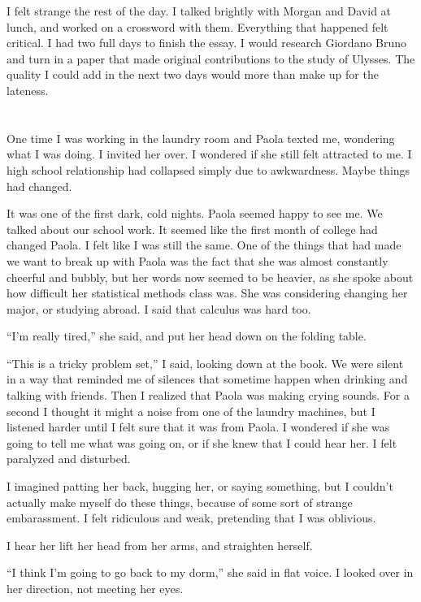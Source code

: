 I felt strange the rest of the day.  I talked brightly with Morgan and David at
lunch, and worked on a crossword with them.  Everything that happened felt
critical.  I had two full days to finish the essay.  I would research Giordano
Bruno and turn in a paper that made original contributions to the study of
Ulysses. The quality I could add in the next two days would more than make up
for the lateness.  

\section{} 

One time I was working in the laundry room and Paola texted me, wondering what I
was doing.  I invited her over.  I wondered if she still felt attracted to me.
I high school relationship had collapsed simply due to awkwardness.  Maybe
things had changed.  

It was one of the first dark, cold nights.  Paola seemed happy to see me.  We
talked about our school work.  It seemed like the first month of college had
changed Paola.  I felt like I was still the same.  One of the things that had
made we want to break up with Paola was the fact that she was almost constantly
cheerful and bubbly, but her words now seemed to be heavier, as she spoke about
how difficult her statistical methods class was.  She was considering changing
her major, or studying abroad.  I said that calculus was hard too. 

``I'm really tired,'' she said, and put her head down on the folding table.

``This is a tricky problem set,'' I said, looking down at the book.  We were
silent in a way that reminded me of silences that sometime happen when drinking
and talking with friends. Then I realized that Paola was making crying sounds.
For a second I thought it might a noise from one of the laundry machines, but I
listened harder until I felt sure that it was from Paola.  I wondered if she
was going to tell me what was going on, or if she knew that I could hear her.
I felt paralyzed and disturbed.  

I imagined patting her back, hugging her, or saying something, but I couldn't
actually make myself do these things, because of some sort of strange
embarassment.  I felt ridiculous and weak, pretending that I was oblivious.

I hear her lift her head from her arms, and straighten herself.

``I think I'm going to go back to my dorm,'' she said in flat voice.  I looked
over in her direction, not meeting her eyes.   

